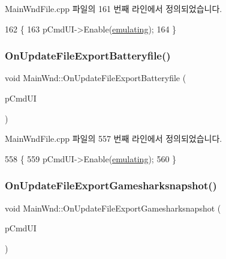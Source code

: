 Main\+Wnd\+File.\+cpp 파일의 161 번째 라인에서 정의되었습니다.


\begin{DoxyCode}
162 \{
163   pCmdUI->Enable(\mbox{\hyperlink{_main_wnd_file_8cpp_af9cc36078b1b311753963297ae7f2a74}{emulating}});
164 \}
\end{DoxyCode}
\mbox{\label{class_main_wnd_af5aa05b853a2792f8448f2e331c5e44a}} 
\subsubsection{\texorpdfstring{On\+Update\+File\+Export\+Batteryfile()}{OnUpdateFileExportBatteryfile()}}
{\footnotesize\ttfamily void Main\+Wnd\+::\+On\+Update\+File\+Export\+Batteryfile (\begin{DoxyParamCaption}\item[{C\+Cmd\+UI $\ast$}]{p\+Cmd\+UI }\end{DoxyParamCaption})\hspace{0.3cm}{\ttfamily [protected]}}



Main\+Wnd\+File.\+cpp 파일의 557 번째 라인에서 정의되었습니다.


\begin{DoxyCode}
558 \{
559   pCmdUI->Enable(\mbox{\hyperlink{_main_wnd_file_8cpp_af9cc36078b1b311753963297ae7f2a74}{emulating}});  
560 \}
\end{DoxyCode}
\mbox{\label{class_main_wnd_a2ec36732add704ab58b3c2a05e336d3b}} 
\subsubsection{\texorpdfstring{On\+Update\+File\+Export\+Gamesharksnapshot()}{OnUpdateFileExportGamesharksnapshot()}}
{\footnotesize\ttfamily void Main\+Wnd\+::\+On\+Update\+File\+Export\+Gamesharksnapshot (\begin{DoxyParamCaption}\item[{C\+Cmd\+UI $\ast$}]{p\+Cmd\+UI }\end{DoxyParamCaption})\hspace{0.3cm}{\ttfamily [protected]}}



